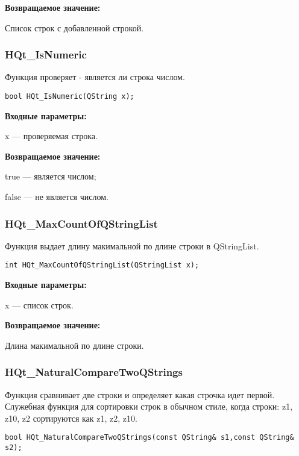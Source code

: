 \documentclass[a4paper,12pt]{article}
\begin{document}
\textbf{Возвращаемое значение:}

Список строк с добавленной строкой.


\subsubsection{HQt\_IsNumeric}\label{HQt_IsNumeric}

Функция проверяет - является ли строка числом.


\begin{lstlisting}[label=code_syntax_HQt_IsNumeric,caption=Синтаксис]
bool HQt_IsNumeric(QString x);
\end{lstlisting}

\textbf{Входные параметры:}

x --- проверяемая строка.

\textbf{Возвращаемое значение:}
 
true --- является числом;

false --- не является числом.


\subsubsection{HQt\_MaxCountOfQStringList}\label{HQt_MaxCountOfQStringList}

Функция выдает длину макимальной по длине строки в QStringList.


\begin{lstlisting}[label=code_syntax_HQt_MaxCountOfQStringList,caption=Синтаксис]
int HQt_MaxCountOfQStringList(QStringList x);
\end{lstlisting}

\textbf{Входные параметры:}
 
x --- список строк.

\textbf{Возвращаемое значение:}

Длина макимальной по длине строки.


\subsubsection{HQt\_NaturalCompareTwoQStrings}\label{HQt_NaturalCompareTwoQStrings}

Функция сравнивает две строки и определяет какая строчка идет первой. Служебная функция для сортировки строк в обычном стиле, когда строки: z1, z10, z2 сортируются как z1, z2, z10.


\begin{lstlisting}[label=code_syntax_HQt_NaturalCompareTwoQStrings,caption=Синтаксис]
bool HQt_NaturalCompareTwoQStrings(const QString& s1,const QString& s2);
\end{lstlisting}
\end{document}
